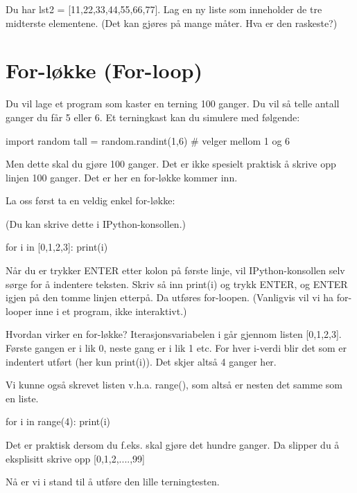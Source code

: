 {\begin{question}
Du har lst2 = [11,22,33,44,55,66,77]. Lag en ny liste som inneholder de tre midterste elementene. (Det kan gjøres på mange måter. Hva er den raskeste?)
\end{question}

\section{For-løkke (For-loop)}

Du vil lage et program som kaster en terning 100 ganger. Du vil så telle antall ganger du får 5 eller 6. Et terningkast kan du simulere med følgende:

\begin{usncodebox}
import random
tall = random.randint(1,6)   # velger mellom 1 og 6
\end{usncodebox}

Men dette skal du gjøre 100 ganger. Det er ikke spesielt praktisk å skrive opp linjen 100 ganger. Det er her en for-løkke kommer inn. 

La oss først ta en veldig enkel for-løkke:

(Du kan skrive dette i IPython-konsollen.) 

\begin{usncodebox}
for i in [0,1,2,3]:
    print(i)
\end{usncodebox}

Når du er trykker ENTER etter kolon på første linje, vil IPython-konsollen selv sørge for å indentere teksten. Skriv så inn print(i) og trykk ENTER, og ENTER igjen på den tomme linjen etterpå. Da utføres for-loopen. (Vanligvis vil vi ha for-looper inne i et program, ikke interaktivt.)

Hvordan virker en for-løkke? Iterasjonsvariabelen i går gjennom listen [0,1,2,3]. Første gangen er i lik 0, neste gang er i lik 1 etc. For hver i-verdi blir det som er indentert utført (her kun print(i)). Det skjer altså 4 ganger her. 

Vi kunne også skrevet listen v.h.a. range(), som altså er nesten det samme som en liste.
\begin{usncodebox}
for i in range(4): 
    print(i)
\end{usncodebox}

Det er praktisk dersom du f.eks. skal gjøre det hundre ganger. Da slipper du å eksplisitt skrive opp [0,1,2,....,99]

Nå er vi i stand til å utføre den lille terningtesten. 

}
